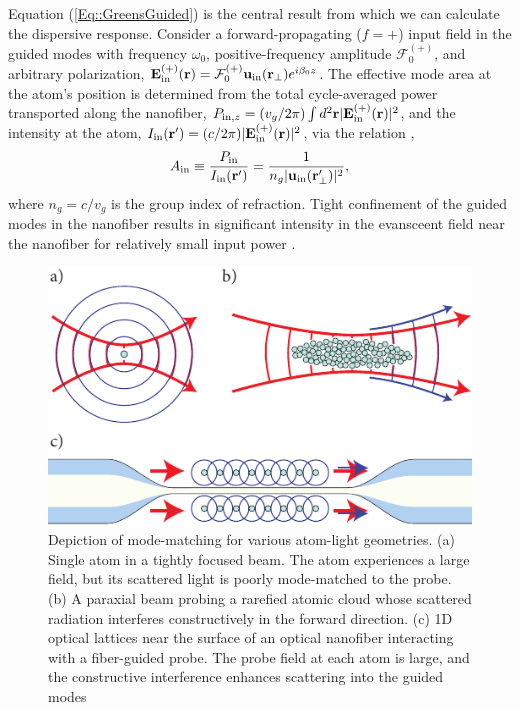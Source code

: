 \documentclass[preprint, aps,pra,onecolumn]{revtex4-1} %
\newcommand{\inp}{{\rm in}}
\newcommand{\Eamp}{\mathcal{F}_0^{(+)}}
\begin{document}
Equation (\ref{Eq::GreensGuided}) is the central result from which we can calculate the dispersive response.  Consider a forward-propagating ($f=+$) input field in the guided modes with frequency $\omega_0$, positive-frequency amplitude $\Eamp$, and arbitrary polarization, $\mathbf{E}^{(+)}_{\inp}(\br) = \Eamp  \mathbf{u}_{\rm in}(\br_\perp) e^{i \beta_0 z}$.   
The effective mode area at the atom's position is determined from the total cycle-averaged power transported along the nanofiber, $P_{{\rm in},z} = (v_g/2\pi) \int d^2\br |\mathbf{E}^{(+)}_{\inp}(\br) |^2$, and the intensity at the atom, $I_{\rm in}(\mathbf{r}') = (c/2\pi) |\mathbf{E}^{(+)}_{\inp}(\br) |^2$, via the relation \cite{domokos_quantum_2002},
 	\begin{align} \label{Eq::AreaIn}
 		A_{\rm in} \equiv \frac{P_{{\rm in}}}{I_{\rm in}(\mathbf{r}')} = \frac{1}{n_g |\mathbf{u}_{\rm in}(\mathbf{r}'_\perp)|^{2}},
	\end{align}
where $n_g = c/v_g$ is the group index of refraction.  
Tight confinement of the guided modes in the nanofiber results in significant intensity in the evansceent field near the nanofiber for relatively small input power \cite{bures_power_1999}.  

\begin{figure}[b]
\includegraphics[scale=0.80]{./Figs/Fig_ModeMatch}
\caption{Depiction of mode-matching for various atom-light geometries. (a) Single atom in a tightly focused beam. The atom experiences a large field, but its scattered light is poorly mode-matched to the probe. (b) A paraxial beam probing a rarefied atomic cloud whose scattered radiation interferes constructively in the forward direction. (c) 1D optical lattices near the surface of an optical nanofiber interacting with a fiber-guided probe. The probe field at each atom is large, and the constructive interference enhances scattering into the guided modes}\label{Fig::ModeMatching}
\end{figure}
\end{document}
